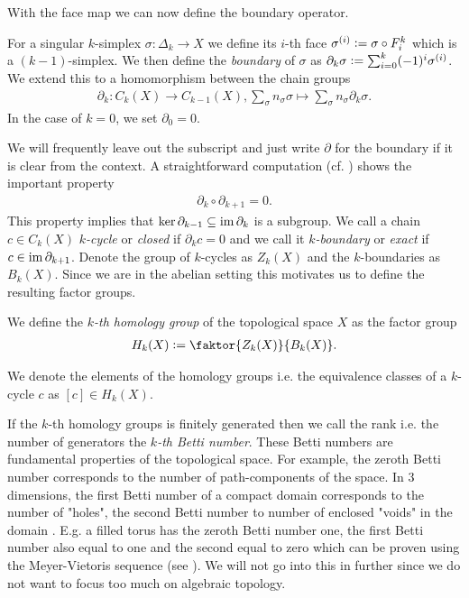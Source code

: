 \documentclass[../master_thesis.tex]{subfiles}
\begin{document}
With the face map we can now define the boundary operator.
\begin{definition}[Boundary]
    For a singular $k$-simplex $\sigma: \Delta_k \rightarrow X$ we define its $i$-th face 
    $\sigma^{(i)} \vcentcolon= \sigma \circ F_i^k$ which is a $(k-1)$-simplex. 
    We then define the \textit{boundary} of $\sigma$ as 
    $\partial_k \sigma \vcentcolon= \sum_{i=0}^k (-1)^i \sigma^{(i)}$. We extend this 
    to a homomorphism between the chain groups
    \begin{align*}
        \partial_k: C_k(X) \rightarrow C_{k-1}(X), 
        \sum_\sigma n_\sigma \sigma \mapsto \sum_\sigma n_\sigma \partial_k \sigma.
    \end{align*}
    In the case of $k=0$, we set $\partial_0 = 0$.
\end{definition}
We will frequently leave out the subscript and just write $\partial$ for the boundary 
if it is clear from the context.
A straightforward computation (cf. \cite[Lemma 1.6]{topology_and_geometry}) shows the 
important property 
\begin{align*}
    \partial_k \circ \partial_{k+1} = 0.
\end{align*}
This property implies that $\ker \partial_{k-1} \subseteq \operatorname{im} \partial_k$ is 
a subgroup. We call a chain $c \in C_k(X)$ \textit{$k$-cycle} or \textit{closed} if $\partial_k c = 0$ and 
we call it \textit{$k$-boundary} or \textit{exact} if $c \in \operatorname{im} \partial_{k+1}$. 
Denote the group of $k$-cycles as $Z_k(X)$ and the $k$-boundaries as $B_k(X)$.
Since we are in the abelian setting this motivates us to define 
the resulting factor groups.
\begin{definition}
    We define the \textit{$k$-th homology group} of the topological space $X$ as the factor group
    \begin{align*}
        H_k(X) \vcentcolon= \faktor{Z_k(X)}{B_k(X)}.
    \end{align*} 
\end{definition}
We denote the elements of the homology groups i.e. the equivalence classes of a 
$k$-cycle $c$ as $[c] \in H_k(X)$.

If the $k$-th homology groups is finitely generated then we 
call the rank i.e. the number of generators the \textit{$k$-th Betti number}. 
These Betti numbers are fundamental properties of the topological space. 
For example, the zeroth Betti number corresponds to the number of 
path-components of the space. In 3 dimensions, the first Betti number of 
a compact domain
corresponds to the number of "holes", the second Betti number to 
number of enclosed "voids" in the domain \cite[p.14]{arnold}. E.g. a filled torus 
has the zeroth Betti number one, the first Betti number also equal to one
and the second equal to zero which can be proven using the Meyer-Vietoris sequence
(see \cite[Sec.\,IV.18]{topology_and_geometry}). We will not go into this in further
since we do not want to focus too much on algebraic topology.
\end{document}

